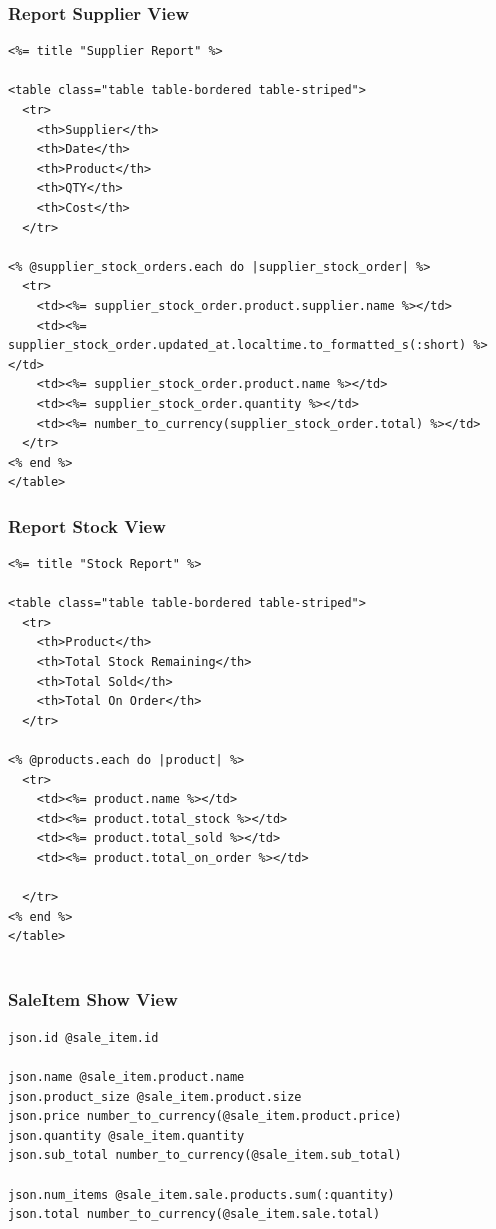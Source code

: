 \documentclass[a4paper]{article}
\begin{document}
\subsubsection{Report Supplier View}
\begin{verbatim}
<%= title "Supplier Report" %>

<table class="table table-bordered table-striped">
  <tr>
  	<th>Supplier</th>
    <th>Date</th>
    <th>Product</th>
    <th>QTY</th>
    <th>Cost</th>
  </tr>

<% @supplier_stock_orders.each do |supplier_stock_order| %>
  <tr>
  	<td><%= supplier_stock_order.product.supplier.name %></td>
    <td><%= supplier_stock_order.updated_at.localtime.to_formatted_s(:short) %></td>
    <td><%= supplier_stock_order.product.name %></td>
    <td><%= supplier_stock_order.quantity %></td>
    <td><%= number_to_currency(supplier_stock_order.total) %></td>
  </tr>
<% end %>
</table>

\end{verbatim}
\subsubsection{Report Stock View}
\begin{verbatim}
<%= title "Stock Report" %>

<table class="table table-bordered table-striped">
  <tr>
  	<th>Product</th>
  	<th>Total Stock Remaining</th>
  	<th>Total Sold</th>
	<th>Total On Order</th>
  </tr>

<% @products.each do |product| %>
  <tr>
  	<td><%= product.name %></td>
  	<td><%= product.total_stock %></td>
  	<td><%= product.total_sold %></td>
	<td><%= product.total_on_order %></td>

  </tr>
<% end %>
</table>


\end{verbatim}
\subsubsection{SaleItem Show View}
\begin{verbatim}
json.id @sale_item.id

json.name @sale_item.product.name
json.product_size @sale_item.product.size
json.price number_to_currency(@sale_item.product.price)
json.quantity @sale_item.quantity
json.sub_total number_to_currency(@sale_item.sub_total)

json.num_items @sale_item.sale.products.sum(:quantity)
json.total number_to_currency(@sale_item.sale.total)


\end{verbatim}
\end{document}
